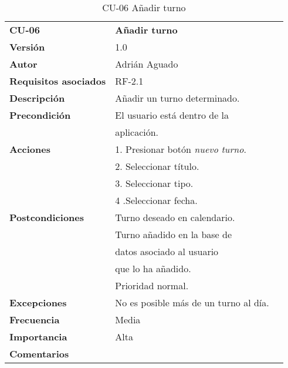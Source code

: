\begin{table}[H]
\begin{tabular}{llr}  
\toprule
\begin{minipage}[b]{0.24\columnwidth}\raggedright\strut
\textbf{CU-06}\strut
\end{minipage} & \begin{minipage}[b]{0.72\columnwidth}\raggedright\strut
\textbf{Añadir turno}\strut
\end{minipage}\tabularnewline
\cmidrule(r){1-2}
\textbf{Versión}       & 1.0           \\
\textbf{Autor}       & Adrián  Aguado    \\
\textbf{Requisitos asociados}       & RF-2.1 \\ 
\textbf{Descripción} & Añadir un turno determinado. \\
\textbf{Precondición} & El usuario está dentro de la \\
& aplicación.       \\
\textbf{Acciones} & 1. Presionar  botón \emph{nuevo turno}. \\
& 2. Seleccionar título. \\
& 3. Seleccionar tipo. \\
& 4 .Seleccionar fecha.\\
\textbf{Postcondiciones} & Turno deseado en calendario. \\
& Turno añadido en la base de \\
&  datos asociado al usuario \\
&  que lo ha añadido.  \\
&  Prioridad normal.  \\
\textbf{Excepciones} &  No es posible más de un turno al día.   \\
\textbf{Frecuencia} & Media          \\
\textbf{Importancia} & Alta            \\
\textbf{Comentarios } &     \\
\bottomrule
\end{tabular}
\caption{CU-06 Añadir turno} 
\end{table}




